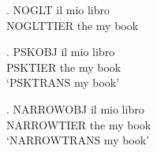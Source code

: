 {\GlossTransSide
\ex. \gll NOGLT il mio libro\\
          NOGLTTIER the my book\\
}

{\GlossTransSide\setlength{\parskip}{2\baselineskip}
\ex. \gll PSKOBJ il mio libro\\
          PSKTIER the my book\\
     \glt `PSKTRANS my book'
}

{\GlossTransSide\setlength{\GlossTransMinWidth}{40em}
\ex. \gll NARROWOBJ il mio libro\\
          NARROWTIER the my book\\
     \glt `NARROWTRANS my book'
}

